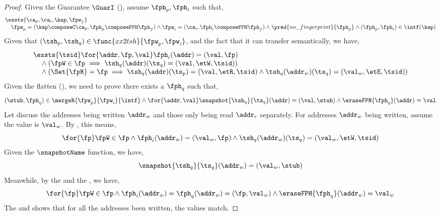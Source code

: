 \begin{proof}
Given the Guarantee \( \GuarI \) (), assume \( \fph_{p}, \fph_{i} \) such that, 
\begin{equation}
\label{def:definition-ph-p-and-i}
\begin{array}{@{}l@{}}
    \exsts{ \ca_{p}, \ca_{i}, \kap, \fpw_{f} }  \\
    \quad \fpw_{p} = (\kap \composeC \ca_{p},\fph_{p} \composeFPH \fph_{f}) 
    \land \fpw_{i} = (\ca_{i},\fph_{i} \composeFPH \fph_{f}) 
    \land \pred{no\_fingerprint}{\fph_{p}} 
    \land ( \fph_{p}, \fph_{i} ) \in \intf(\kap)
\end{array}
\end{equation}
Given that \( (\tsh_{p}, \tsh_{q}) \in \func{xx2tsh}{\fpw_{p}, \fpw_{i}} \), and the fact that it can transfer semantically, we have, 
\begin{equation}
\label{equ:property-of-fph-i-tsh-pq}
\begin{array}{@{}l@{}}
\exsts{\tsid} \for{ \addr, \fp, \val } \fph_{i}(\addr) = (\val, \fp) \\
\quad {} \land (\fpW \in \fp \implies \tsh_{q}(\addr)(\ts_{q}) = (\val, \etW, \tsid))  \\
\quad {} \land (\Set{\fpR} = \fp \implies \tsh_{q}(\addr)(\ts_{p}) = (\val, \etR, \tsid) \land \tsh_{q}(\addr_{w})(\ts_{q}) = (\val_{w}, \etE, \tsid))

\end{array}
\end{equation}
Given the flatten (), we need to prove there exists a \( \fph_{q} \) such that,
\[
    ( \stub, \fph_{q}) \in \mergeR{\fpw_{p}}{\fpw_{i}}{\intf}
    \land \for{\addr, \val} \snapshot{\tsh_{q}}{\ts_{q}}(\addr) = (\val, \stub) 
    \land \eraseFPH{\fph_{q} }(\addr)  = \val
\]
Let discuss the addresses being written \( \addr_{w} \) and those only being read \( \addr_{r} \) separately.
For addresses \( \addr_{w} \) being written, assume the value is \( \val_{w} \).
By , this means,
\begin{equation}
\label{equ:global-write}
\for{ \fp }
\fpW \in \fp
\land \fph_{i}(\addr_{w}) = (\val_{w}, \fp)
\land \tsh_{q}(\addr_{w})(\ts_{q}) = (\val_{w}, \etW, \tsid)
\end{equation}
Given  the \( \snapshotName \) function, we have, 
\begin{equation}
\label{equ:snap-write}
\snapshot{\tsh_{q}}{\ts_{q}}(\addr_{w}) = (\val_{w}, \stub)
\end{equation}
Meanwhile, by the  and the , we have,
\begin{equation}
\label{equ:local-write}
    \for{ \fp }
    \fpW \in \fp
    \land \fph_{i}(\addr_{w}) = \fph_{q}(\addr_{w}) = (\fp, \val_{w})
    \land \eraseFPH{\fph_{q}}(\addr_{w}) = \val_{w}
\end{equation}
The  and  shows that for all the addresses been written, the values match.


\end{proof}
